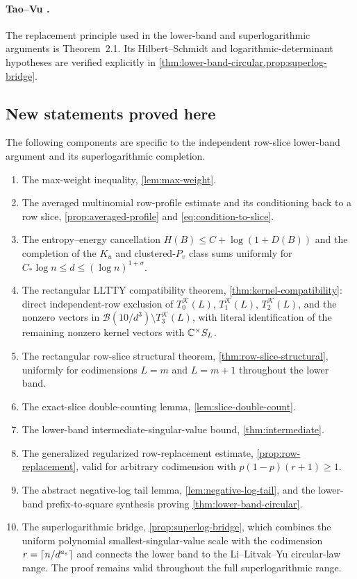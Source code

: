 \paragraph{Tao--Vu \cite{TV10}.}
The replacement principle used in the lower-band and superlogarithmic arguments is Theorem~2.1. Its Hilbert--Schmidt and logarithmic-determinant hypotheses are verified explicitly in \cref{thm:lower-band-circular,prop:superlog-bridge}.

\subsection{New statements proved here}

The following components are specific to the independent row-slice lower-band argument and its superlogarithmic completion.
\begin{enumerate}
\item The max-weight inequality, \cref{lem:max-weight}.
\item The averaged multinomial row-profile estimate and its conditioning back to a row slice, \cref{prop:averaged-profile} and \eqref{eq:condition-to-slice}.
\item The entropy--energy cancellation $H(B)\le C+\log(1+D(B))$ and the completion of the $K_u$ and clustered-$P_v$ class sums uniformly for $C_*\log n\le d\le(\log n)^{1+\sigma}$.
\item The rectangular LLTTY compatibility theorem, \cref{thm:kernel-compatibility}: direct independent-row exclusion of $T_0^{\mathcal K}(L)$, $T_1^{\mathcal K}(L)$, $T_2^{\mathcal K}(L)$, and the nonzero vectors in $\mathcal B(10/d^3)\setminus T_3^{\mathcal K}(L)$, with literal identification of the remaining nonzero kernel vectors with $\mathbb C^{\times}S_L$.
\item The rectangular row-slice structural theorem, \cref{thm:row-slice-structural}, uniformly for codimensions $L=m$ and $L=m+1$ throughout the lower band.
\item The exact-slice double-counting lemma, \cref{lem:slice-double-count}.
\item The lower-band intermediate-singular-value bound, \cref{thm:intermediate}.
\item The generalized regularized row-replacement estimate, \cref{prop:row-replacement}, valid for arbitrary codimension with $p(1-p)(r+1)\ge1$.
\item The abstract negative-log tail lemma, \cref{lem:negative-log-tail}, and the lower-band prefix-to-square synthesis proving \cref{thm:lower-band-circular}.
\item The superlogarithmic bridge, \cref{prop:superlog-bridge}, which combines the uniform polynomial smallest-singular-value scale with the codimension $r=\left\lceil n/d^{a_\varepsilon}\right\rceil$ and connects the lower band to the Li--Litvak--Yu circular-law range. The proof remains valid throughout the full superlogarithmic range.
\end{enumerate}

